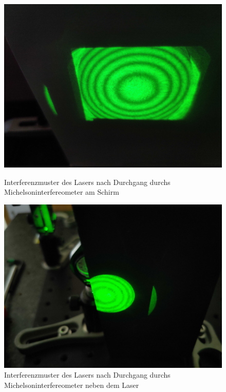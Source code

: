 \documentclass[ngerman]{scrartcl}
\begin{document}
\setcapindent{0pt}
\begin{figure}[H]
    \centering
    \begin{minipage}[t]{0.45\linewidth}
        \centering
        \includegraphics[width=\linewidth]{fig/Compressed/michelson_konz_schirm.jpg}
        \caption{Interferenzmuster des Lasers nach Durchgang durchs Michelsoninterfereometer am Schirm}
        \label{fig:michelson_konz_sammel}
    \end{minipage}%
    \hspace*{\fill}
    \begin{minipage}[t]{0.45\linewidth}
        \centering
        \includegraphics[width=\linewidth]{fig/Compressed/michelson_konz_tuer.jpg}
        \caption{Interferenzmuster des Lasers nach Durchgang durchs Michelsoninterfereometer neben dem Laser}
        \label{fig:michelson_konz_sammel_tuer}
    \end{minipage}
\end{figure}
\setcaphanging
\end{document}

